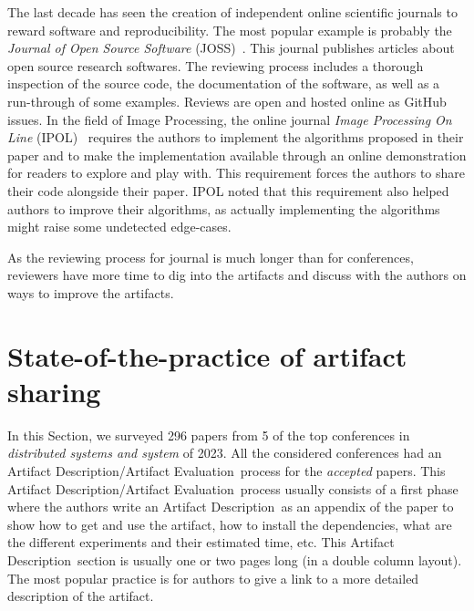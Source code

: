 \documentclass[sigconf,natbib=false]{acmart}
\newcommand{\ad}{Artifact Description}
\newcommand{\aeval}{Artifact Evaluation}
\newcommand{\adae}{\ad/\aeval}
\newcommand{\todo}[1]{{\color{red}{TODO: #1}}}
\begin{document}
The last decade has seen the creation of independent online scientific journals to reward software and reproducibility.
The most popular example is probably the \emph{Journal of Open Source Software} (JOSS)\ \cite{smith2018journal}.
This journal publishes articles about open source research softwares.
The reviewing process includes a thorough inspection of the source code, the documentation of the software, as well as a run-through of some examples.
Reviews are open and hosted online as GitHub issues.
In the field of Image Processing, the online journal \emph{Image Processing On Line} (IPOL)\ \cite{colom2015ipol} requires the authors to implement the algorithms proposed in their paper and to make the implementation available through an online demonstration for readers to explore and play with.
This requirement forces the authors to share their code alongside their paper.
IPOL noted that this requirement also helped authors to improve their algorithms, as actually implementing the algorithms might raise some undetected edge-cases.

As the reviewing process for journal is much longer than for conferences, reviewers have more time to dig into the artifacts and discuss with the authors on ways to improve the artifacts.





%
%

%
\section{State-of-the-practice of artifact sharing}\label{sec:sop}



In this Section, we surveyed 296 papers from 5 of the top conferences in \emph{distributed systems and system} of 2023.
All the considered conferences had an \adae\ process for the \emph{accepted} papers.
This \adae\ process usually consists of a first phase where the authors write an \ad\ as an appendix of the paper to show how to get and use the artifact, how to install the dependencies, what are the different experiments and their estimated time, etc.
This \ad\ section is usually one or two pages long (in a double column layout).
The most popular practice is for authors to give a link to a more detailed description of the artifact.
\end{document}
